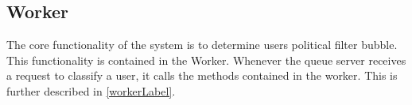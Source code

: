 \subsection{Worker}
The core functionality of the system is to determine users political filter
bubble. This functionality is contained in the Worker. Whenever the queue server
receives a request to classify a user, it calls the methods contained in the
worker. This is further described in \autoref{workerLabel}.
